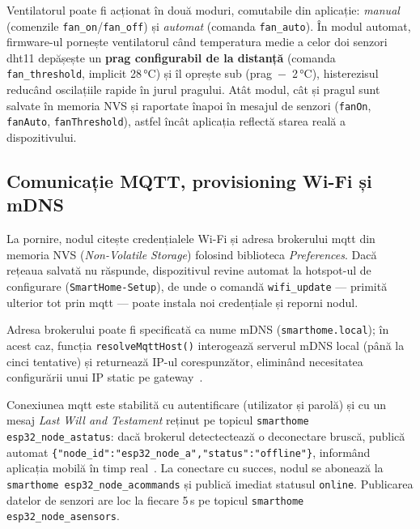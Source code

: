 Ventilatorul poate fi acționat în două moduri, comutabile din aplicație:
\emph{manual} (comenzile \texttt{fan\_on}/\texttt{fan\_off}) și
\emph{automat} (comanda \texttt{fan\_auto}). În modul automat, firmware-ul
pornește ventilatorul când temperatura medie a celor doi senzori \gls{dht}11
depășește un \textbf{prag configurabil de la distanță} (comanda
\texttt{fan\_threshold}, implicit 28\,°C) și îl oprește sub
(prag~$-$~2\,°C), histerezisul reducând oscilațiile rapide în jurul pragului.
Atât modul, cât și pragul sunt salvate în memoria NVS și raportate înapoi în
mesajul de senzori (\texttt{fanOn}, \texttt{fanAuto}, \texttt{fanThreshold}),
astfel încât aplicația reflectă starea reală a dispozitivului.

\subsection{Comunicație MQTT, provisioning Wi-Fi și mDNS}
\label{sec:mqtt-provisioning}

La pornire, nodul citește credențialele Wi-Fi și adresa brokerului
\gls{mqtt} din memoria NVS (\emph{Non-Volatile Storage}) folosind
biblioteca \emph{Preferences}.
Dacă rețeaua salvată nu răspunde, dispozitivul revine automat la
hotspot-ul de configurare (\texttt{SmartHome-Setup}), de unde o comandă
\texttt{wifi\_update} — primită ulterior tot prin \gls{mqtt} — poate
instala noi credențiale și reporni nodul.

Adresa brokerului poate fi specificată ca nume mDNS (\texttt{smarthome.local});
în acest caz, funcția \texttt{resolveMqttHost()} interogează serverul mDNS
local (până la cinci tentative) și returnează IP-ul corespunzător,
eliminând necesitatea configurării unui IP static pe gateway~\cite{rfc6762mdns}.

Conexiunea \gls{mqtt} este stabilită cu autentificare (utilizator și parolă)
și cu un mesaj \emph{Last Will and Testament} reținut pe topicul
\texttt{smarthome\slb{} esp32\_node\_a\slb{}status}:
dacă brokerul detectectează o deconectare bruscă, publică automat
\texttt{\{"node\_id":\allowbreak"esp32\_node\_a",\allowbreak"status":\allowbreak"offline"\}}, informând
aplicația mobilă în timp real~\cite{oasis2019mqtt}.
La conectare cu succes, nodul se abonează la
\texttt{smarthome\slb{} esp32\_node\_a\slb{}commands} și publică imediat statusul
\texttt{online}.
Publicarea datelor de senzori are loc la fiecare 5\,s pe topicul
\texttt{smarthome\slb{} esp32\_node\_a\slb{}sensors}.

